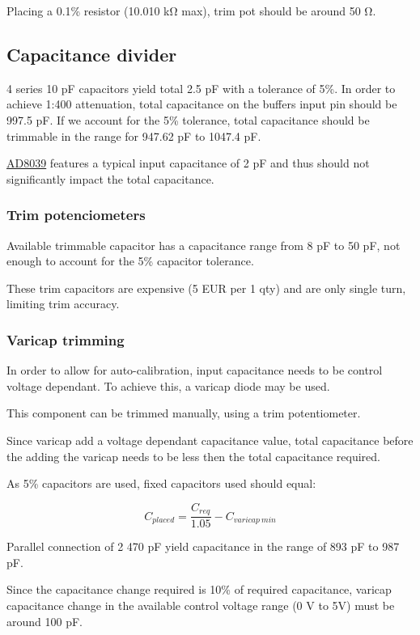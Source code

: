 \documentclass[11pt]{article}
\begin{document}
Placing a 0.1\% resistor (10.010 \si{\kilo \ohm} max), trim pot should be around 
50 \si{\ohm}.

\subsection{Capacitance divider}
4 series 10 \si{\pico \farad } capacitors yield total 2.5 \si{\pico \farad } with a 
tolerance of 5\%. In order to achieve 1:400 attenuation, total capacitance on the 
buffers input pin should be 997.5 pF. If we account for the 5\% tolerance, 
total capacitance should be trimmable in the range for 947.62 pF to 1047.4 pF.

\href{https://www.analog.com/media/en/technical-documentation/data-sheets/AD8038_8039.pdf}{AD8039}
features a typical input capacitance of 2 pF and thus should not significantly 
impact the total capacitance.


\subsubsection{Trim potenciometers}
Available trimmable capacitor has a capacitance range from 8 pF to 50 pF, not 
enough to account for the 5\% capacitor tolerance.

These trim capacitors are expensive (5 EUR per 1 qty) and are only single turn,
limiting trim accuracy. 


\subsubsection{Varicap trimming}
In order to allow for auto-calibration, input capacitance needs to be control
voltage dependant. To achieve this, a varicap diode may be used.

This component can be trimmed manually, using a trim potentiometer.

Since varicap add a voltage dependant capacitance value, total capacitance before
the adding the varicap needs to be less then the total capacitance required. 

As 5\% capacitors are used, fixed capacitors used should equal:

\begin{equation}
  C_{placed} = \frac{C_{req}}{1.05} - C_{varicap\ min}
  \label{eq:}
\end{equation}

Parallel connection of 2 470 pF yield capacitance in the range of 893 pF to 987 pF.

Since the capacitance change required is 10\% of required capacitance, varicap 
capacitance change in the available control voltage range (0 V to 5V) must be around
100 pF.\\
\end{document}

